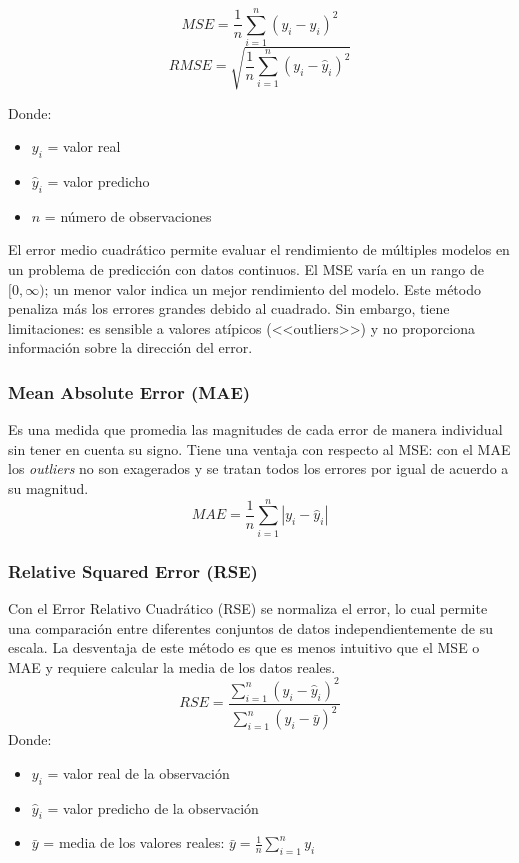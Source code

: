 \documentclass[12pt]{article}
\begin{document}
\begin{equation}
    MSE = \frac{1}{n} \sum_{i=1}^{n} (y_i - \hat{y}_i)^2
\end{equation}
\begin{equation}
    RMSE = \sqrt{\frac{1}{n} \sum_{i=1}^{n} (y_i - \hat{y}_i)^2}
\end{equation}

Donde:
\begin{itemize}
    \item $y_i$ = valor real
    \item $\hat{y}_i$ = valor predicho
    \item $n$ = número de observaciones
\end{itemize}

El error medio cuadrático permite evaluar el rendimiento de múltiples modelos en un problema de predicción con datos continuos. El MSE varía en un rango de $[0, \infty)$; un menor valor indica un mejor rendimiento del modelo. Este método penaliza más los errores grandes debido al cuadrado. Sin embargo, tiene limitaciones: es sensible a valores atípicos (<<outliers>>) y no proporciona información sobre la dirección del error.

\cite{De0a100enIA}

\subsubsection{Mean Absolute Error (MAE)}
Es una medida que promedia las magnitudes de cada error de manera individual sin tener en cuenta su signo. Tiene una ventaja con respecto al MSE: con el MAE los \textit{outliers} no son exagerados y se tratan todos los errores por igual de acuerdo a su magnitud.
\begin{equation}
    MAE = \frac{1}{n} \sum_{i=1}^{n} |y_i - \hat{y}_i|
\end{equation}

\cite{De0a100enIA}

\subsubsection{Relative Squared Error (RSE)}
Con el Error Relativo Cuadrático (RSE) se normaliza el error, lo cual permite una comparación entre diferentes conjuntos de datos independientemente de su escala. La desventaja de este método es que es menos intuitivo que el MSE o MAE y requiere calcular la media de los datos reales.
\begin{equation}
    RSE = \frac{\sum_{i=1}^{n} (y_i - \hat{y}_i)^2}{\sum_{i=1}^{n} (y_i - \bar{y})^2} 
\end{equation}
Donde:
\begin{itemize}
    \item $y_i$ = valor real de la observación 
    \item $\hat{y}_i$ = valor predicho de la observación 
    \item $\bar{y}$ = media de los valores reales: $\bar{y} = \frac{1}{n} \sum_{i=1}^{n} y_i$
\end{itemize}
\cite{De0a100enIA}
\end{document}
